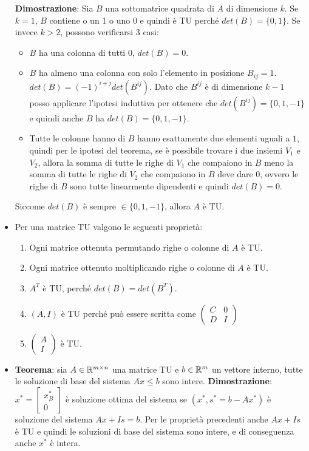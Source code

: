 \begin{itemize}
	\textbf{Dimostrazione}: Sia $B$ una sottomatrice quadrata di $A$ di dimensione $k$. Se $k = 1$, $B$ contiene o un 1 o uno 0 e quindi è TU perché $det(B) = \{0,1\}$. Se invece $k > 2$, possono verificarsi 3 casi:
	\begin{itemize}
		\item $B$ ha una colonna di tutti 0, $det(B)=0$.
		\item $B$ ha almeno una colonna con solo l'elemento in posizione $B_{ij} = 1$. $det(B) = (-1)^{i+j}det(B^{ij})$. Dato che $B^{ij}$ è di dimensione $k-1$ posso applicare l'ipotesi induttiva per ottenere che $det(B^{ij}) = \{ 0,1,-1 \}$ e quindi anche $B$ ha $det(B) = \{0, 1, -1\}$.
		\item Tutte le colonne hanno di $B$ hanno esattamente due elementi uguali a $1$, quindi per le ipotesi del teorema, se è possibile trovare i due insiemi $V_1$ e $V_2$, allora la somma di tutte le righe di $V_1$ che compaiono in $B$ meno la somma di tutte le righe di $V_2$ che compaiono in $B$ deve dare 0, ovvero le righe di $B$ sono tutte linearmente dipendenti e quindi $det(B) = 0$.
	\end{itemize}
	Siccome $det(B)$ è sempre $\in \{0, 1, -1\}$, allora $A$ è TU.
	\item Per una matrice TU valgono le seguenti proprietà:
	\begin{enumerate}
		\item Ogni matrice ottenuta permutando righe o colonne di $A$ è TU.
		\item Ogni matrice ottenuto moltiplicando righe o colonne di $A$ è TU.
		\item $A^T$ è TU, perché $det(B) = det(B^T)$.
		\item $(A, I)$ è TU perché può essere scritta come $\begin{pmatrix}
		C & 0 \\
		D & I
		\end{pmatrix}$
		\item $\begin{pmatrix}
		A \\
		I
		\end{pmatrix}$ è TU.
	\end{enumerate}
	\item \textbf{Teorema}: sia $A \in \mathbb{R}^{m \times n}$ una matrice TU e $b \in \mathbb{R}^m$ un vettore interno, tutte le soluzione di base del sistema $Ax \leq b$ sono intere. \textbf{Dimostrazione}:  $x^* = \begin{bmatrix}
	x_{B}^* \\
	0
	\end{bmatrix}$ è soluzione ottima del sistema se $(x^*, s^* = b - Ax^*)$ è soluzione del sistema $Ax + Is = b$. Per le proprietà precedenti anche $Ax+Is$ è TU e quindi le soluzioni di base del sistema sono intere, e di conseguenza anche $x^*$ è intera.

\end{itemize}
